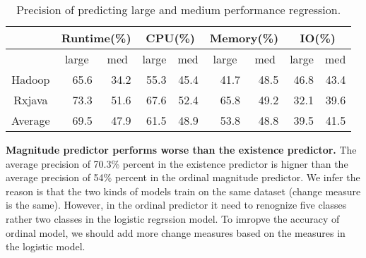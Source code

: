 \begin{table}[]
	\centering
	\footnotesize
	\caption{Precision of predicting large and medium performance regression.}
	\label{tab:preeffect}
\begin{tabular}{|c|r|r|r|r|r|r|r|r|}
	\hline
	& \multicolumn{2}{c|}{Runtime(\%)}                      & \multicolumn{2}{c|}{CPU(\%)}                          & \multicolumn{2}{c|}{Memory(\%)}                       & \multicolumn{2}{c|}{IO(\%)}                           \\ \hline
	& \multicolumn{1}{c|}{large} & \multicolumn{1}{c|}{med} & \multicolumn{1}{c|}{large} & \multicolumn{1}{c|}{med} & \multicolumn{1}{c|}{large} & \multicolumn{1}{c|}{med} & \multicolumn{1}{c|}{large} & \multicolumn{1}{c|}{med} \\ \hline
	Hadoop                        & 65.6                       & 34.2                     & 55.3                       & 45.4                     & 41.7                       & 48.5                     & 46.8                       & 43.4                     \\ \hline
	Rxjava                        & 73.3                       & 51.6                     & 67.6                       & 52.4                     & 65.8                       & 49.2                     & 32.1                       & 39.6                     \\ \hline
	\multicolumn{1}{|l|}{Average} & 69.5                       & 47.9                     & 61.5                       & 48.9                     & 53.8                       & 48.8                     & 39.5                       & 41.5                     \\ \hline
\end{tabular}
\end{table}

\textbf{Magnitude predictor performs worse than the existence predictor.} The average precision of 70.3\% percent in the existence predictor is higner than the average precision of 54\% percent in the ordinal magnitude predictor. We infer the reason is that the two kinds of models train on the same dataset (change measure is the same). However, in the ordinal predictor it need to renognize five classes rather two classes in the logistic regrssion model. To imropve the accuracy of ordinal model, we should add more change measures based on the measures in the logistic model.

